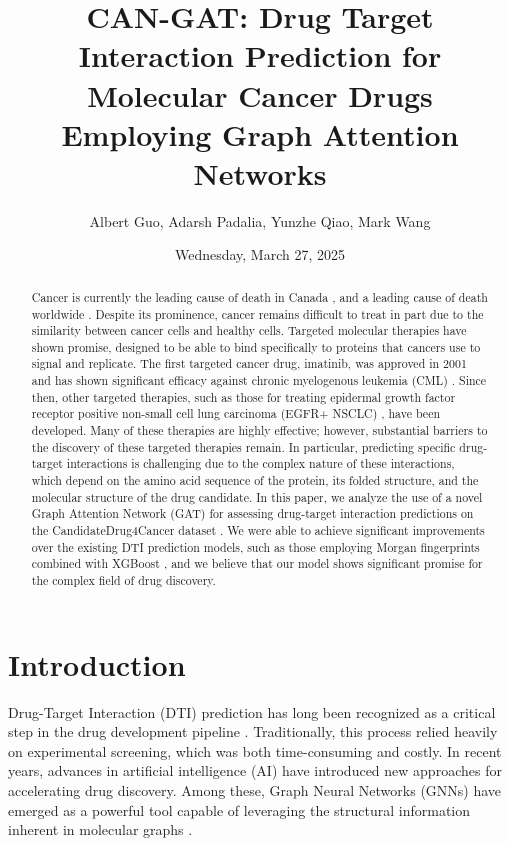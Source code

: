 \documentclass[fontsize=11pt]{article}
\title{CAN-GAT: Drug Target Interaction Prediction for Molecular Cancer Drugs Employing Graph Attention Networks}
\author{Albert Guo, Adarsh Padalia, Yunzhe Qiao, Mark Wang}
\date{Wednesday, March 27, 2025}
\begin{document}
\maketitle
\begin{abstract}
Cancer is currently the leading cause of death in Canada \cite{CCS2021}, and a leading cause of death worldwide \cite{Sung2021}. Despite its prominence, cancer remains difficult to treat in part due to the similarity between cancer cells and healthy cells. Targeted molecular therapies have shown promise, designed to be able to bind specifically to proteins that cancers use to signal and replicate. The first targeted cancer drug, imatinib, was approved in 2001 and has shown significant efficacy against chronic myelogenous leukemia (CML) \cite{Druker2001}. Since then, other targeted therapies, such as those for treating epidermal growth factor receptor positive non-small cell lung carcinoma (EGFR+ NSCLC) \cite{Rosell2012}, have been developed. Many of these therapies are highly effective; however, substantial barriers to the discovery of these targeted therapies remain. In particular, predicting specific drug-target interactions is challenging due to the complex nature of these interactions, which depend on the amino acid sequence of the protein, its folded structure, and the molecular structure of the drug candidate. In this paper, we analyze the use of a novel Graph Attention Network (GAT) \cite{Velickovic2018} for assessing drug-target interaction predictions on the CandidateDrug4Cancer dataset \cite{Ye2022}. We were able to achieve significant improvements over the existing DTI prediction models, such as those employing Morgan fingerprints \cite{Rogers2010} combined with XGBoost \cite{ChenGuestrin2016}, and we believe that our model shows significant promise for the complex field of drug discovery.
\end{abstract}

\section*{Introduction}

Drug-Target Interaction (DTI) prediction has long been recognized as a critical step in the drug development pipeline \cite{Chen2016}. Traditionally, this process relied heavily on experimental screening, which was both time-consuming and costly. In recent years, advances in artificial intelligence (AI) have introduced new approaches for accelerating drug discovery. Among these, Graph Neural Networks (GNNs) have emerged as a powerful tool capable of leveraging the structural information inherent in molecular graphs \cite{Velickovic2018}.
\end{document}
